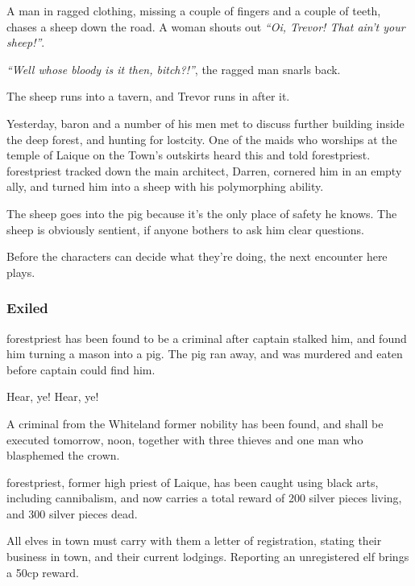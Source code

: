 \begin{boxtext}
	A man in ragged clothing, missing a couple of fingers and a couple of teeth, chases a sheep down the road.  A woman shouts out \emph{``Oi, Trevor! That ain't your sheep!''}.

	\emph{``Well whose bloody is it then, bitch?!''}, the ragged man snarls back.

	The sheep runs into a tavern, and Trevor runs in after it.
\end{boxtext}

Yesterday, \gls{baron} and a number of his men met to discuss further building inside the deep forest, and hunting for \gls{lostcity}.  One of the maids who worships at the temple of Laique on the Town's outskirts heard this and told \gls{forestpriest}.  \Gls{forestpriest} tracked down the main architect, Darren, cornered him in an empty ally, and turned him into a sheep with his polymorphing ability.

The sheep goes into the \gls{pig} because it's the only place of safety he knows.  The sheep is obviously sentient, if anyone bothers to ask him clear questions.

Before the characters can decide what they're doing, the next encounter here plays.

\subsubsection{ Exiled}

\Gls{forestpriest} has been found to be a criminal after \gls{captain} stalked him, and found him turning a mason into a pig.  The pig ran away, and was murdered and eaten before \gls{captain} could find him.

\begin{speechtext}
	Hear, ye! Hear, ye!

	A criminal from the Whiteland former nobility has been found, and shall be executed tomorrow, noon, together with three thieves and one man who blasphemed the crown.

	\Gls{forestpriest}, former high priest of Laique, has been caught using black arts, including cannibalism, and now carries a total reward of 200 silver pieces living, and 300 silver pieces dead.

	All elves in town must carry with them a letter of registration, stating their business in town, and their current lodgings.  Reporting an unregistered elf brings a 50cp reward.

\end{speechtext}


